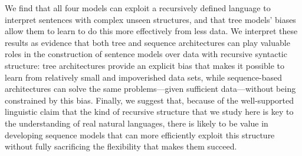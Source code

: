 We find that all four models can exploit a recursively defined language to interpret sentences with complex unseen structures, and that tree models' biases allow them to learn to do this more effectively from less data.
We interpret these results as evidence that both tree and sequence architectures can play valuable roles in the construction of sentence models over data with recursive syntactic structure: tree architectures provide an explicit bias that makes it possible to learn from relatively small and impoverished data sets, while sequence-based architectures can solve the same problems---given sufficient data---without being constrained by this bias. Finally, we suggest that, because of the well-supported linguistic claim that the kind of recursive structure that we study here is key to the understanding of real natural languages, there is likely to be value in developing sequence models that can more efficiently exploit this structure without fully sacrificing the flexibility that makes them succeed.

